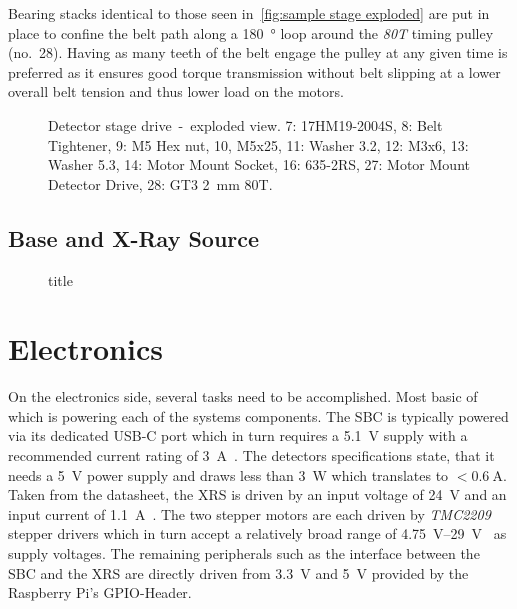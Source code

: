             Bearing stacks identical to those seen in~\cref{fig:sample stage exploded} are put in place to confine the belt path along a \qty{180}{\degree} loop around the \textit{80T} timing pulley (no.~28).
            Having as many teeth of the belt engage the pulley at any given time is preferred as it ensures good torque transmission without belt slipping at a lower overall belt tension and thus lower load on the motors.
            \begin{figure}[!h]
                \centering
                
                \caption[Detector stage drive~--~exploded view]{Detector stage drive~-~exploded view. 7: 17HM19-2004S, 8: Belt Tightener, 9: M5 Hex nut, 10, M5x25, 11: Washer 3.2, 12: M3x6, 13: Washer 5.3, 14: Motor Mount Socket, 16: 635-2RS, 27: Motor Mount Detector Drive, 28: GT3 \qty{2}{\milli\meter} 80T.}
                \label{fig:detector drive exploded}
            \end{figure}

        \subsection{Base and X-Ray Source}
            \begin{figure}[!ht]
                \centering
                
                \caption[short]{title}%
                \label{fig:source exploded}
            \end{figure}

    \clearpage
    \section{Electronics}\label{sec:electronics}
        On the electronics side, several tasks need to be accomplished.
        Most basic of which is powering each of the systems components.
        The SBC is typically powered via its dedicated USB-C port which in turn requires a \qty{5.1}{\volt} supply with a recommended current rating of \qty{3}{\ampere}~\cite{Manual.Documentation.RPF}.
        The detectors specifications state, that it needs a \qty{5}{\volt} power supply and draws less than \qty{3}{\watt} which translates to \(<\qty{0.6}{\ampere}\).
        Taken from the datasheet, the XRS is driven by an input voltage of \qty{24}{\volt} and an input current of \qty{1.1}{\ampere}~\cite{Manual.MAGPRODataSheet.QD}.
        The two stepper motors are each driven by \textit{TMC2209} stepper drivers which in turn accept a relatively broad range of \qtyrange{4.75}{29}{\volt}~\cite{Manual.TMC2209Datasheet} as supply voltages.
        The remaining peripherals such as the interface between the SBC and the XRS are directly driven from \qty{3.3}{\volt} and \qty{5}{\volt} provided by the Raspberry Pi's GPIO-Header.

